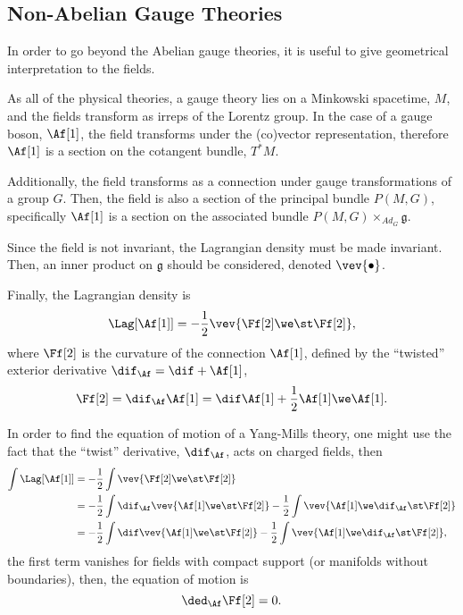 \subsection{Non-Abelian Gauge Theories}

In order to go beyond the Abelian gauge theories, it is useful to give geometrical interpretation to the fields.

As all of the physical theories, a gauge theory lies on a Minkowski spacetime, $M$, and the fields transform as irreps of the Lorentz group. In the case of a gauge boson,  $\Af[1]$, the field transforms under the (co)vector representation, therefore $\Af[1]$ is a section on the cotangent bundle, $T^*M$.

Additionally, the field transforms as a connection under gauge transformations of a group $G$. Then, the field is also a section of the principal bundle $P(M,G)$, specifically $\Af[1]$ is a section on the associated bundle $P(M,G) \times_{Ad_G} \mathfrak{g}$.

Since the field is not invariant, the Lagrangian density must be made invariant. Then, an inner product on $\mathfrak{g}$ should be considered, denoted $\vev{\bullet}$.

Finally, the Lagrangian density is
\begin{align}
  \Lag[\Af[1]] = -\frac{1}{2} \vev{ \Ff[2] \we \st \Ff[2] },
\end{align}
where $\Ff[2]$ is the curvature of the connection $\Af[1]$, defined by the ``twisted'' exterior derivative $\dif_{\Af}= \dif + \Af[1]$,
\begin{align}
  \Ff[2] = \dif_{\Af} \Af[1] = \dif\Af[1] + \frac{1}{2} \Af[1] \we \Af[1].
\end{align}


\begin{WEbox}[%
    frametitle={Equations of Motion for Yang-Mills Theories},
    frametitlerule=true,
    frametitlealignment=\centering,
    frametitleaboveskip=10pt,]
  In order to find the equation of motion of a Yang-Mills theory, one might use the fact that the ``twist'' derivative, $\dif_{\Af}$, acts on charged fields, then
  \begin{align*}
    \int \Lag[\Af[1]]
    &= -\frac{1}{2} \int \vev{ \Ff[2]\we \st \Ff[2] } \\
    &= -\frac{1}{2} \int \dif_{\Af} \vev{ \Af[1] \we \st \Ff[2] } - \frac{1}{2}\int \vev{ \Af[1] \we \dif_{\Af} \st \Ff[2] } \\
    &= -\frac{1}{2} \int \dif \vev{ \Af[1] \we \st \Ff[2] } - \frac{1}{2} \int \vev{ \Af[1] \we \dif_{\Af} \st \Ff[2] },
  \end{align*}
  the first term vanishes for fields with compact support (or manifolds without boundaries), then, the equation of motion is 
  \begin{equation*}
    \ded_{\Af}\Ff[2] =0.
  \end{equation*}
\end{WEbox}





